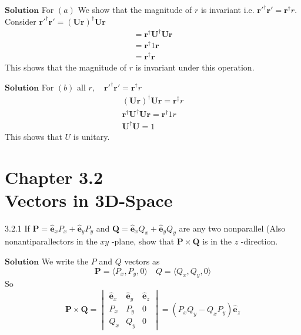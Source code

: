 \documentclass{styles/kaobook}
\begin{document}
$\boxed{\textbf{Solution}}$ For $(a)$ We show that the magnitude of $r$ is invariant i.e. $\mathbf{r}'^{\dagger} \mathbf{r}'=\mathbf{r}^{\dagger} r$. Consider $\mathbf{r}'^{\dagger} \mathbf{r}'=(\mathbf{U} \mathbf{r})^{\dagger} \mathbf{U} \mathbf{r}$
$$
\begin{array}{l}
=\mathbf{r}^{\dagger}  \mathbf{U}^{\dagger} \mathbf{U} \mathbf{r} \\
=\mathbf{r}^{\dagger} 1 \mathbf{r} \\
=\mathbf{r}^{\dagger} \mathbf{r}
\end{array}
$$
This shows that the magnitude of $r$ is invariant under this operation.




$\boxed{\textbf{Solution}}$ For $(b)$ all $r, \quad \mathbf{r}'^{\dagger} \mathbf{r}'=\mathbf{r}^{\dagger} r$
$$
\begin{array}{l}
(\mathbf{U} \mathbf{r})^{\dagger} \mathbf{U} \mathbf{r}=\mathbf{r}^{\dagger} r \\
\mathbf{r}^{\dagger}  \mathbf{U}^{\dagger} \mathbf{U} \mathbf{r}=\mathbf{r}^{\dagger} 1 r \\
 \mathbf{U}^{\dagger} \mathbf{U}=1
\end{array}
$$
This shows that $U$ is unitary.




\newpage

\chapter*{Chapter 3.2 \\ Vectors in 3D-Space}

\begin{greenbox}{3.2.1}
If $\mathbf{P}=\hat{\mathbf{e}}_{x} P_{x}+\hat{\mathbf{e}}_{y} P_{y}$ and $\mathbf{Q}=\hat{\mathbf{e}}_{x} Q_{x}+\hat{\mathbf{e}}_{y} Q_{y}$ are any two nonparallel (Also nonantiparallectors in the $x y$ -plane, show that $\mathbf{P} \times \mathbf{Q}$ is in the $z$ -direction.
\end{greenbox}

$\boxed{\textbf{Solution}}$ We write the $P$ and $Q$ vectors as
$$\mathbf{P} = \langle P_x, P_y,0\rangle \quad Q = \langle Q_x, Q_y,0\rangle$$
So
$$\mathbf{P} \times \mathbf{Q} = \begin{vmatrix}
\hat{\mathbf{e}}_{x} & \hat{\mathbf{e}}_{y} & \hat{\mathbf{e}}_{z}\\ 
P_{x} & P_{y} & 0\\ 
Q_{x} & Q_{y} & 0
\end{vmatrix} =  (P_{x} Q_{y} - Q_{x} P_{y})\hat{\mathbf{e}}_{z}$$
\end{document}
